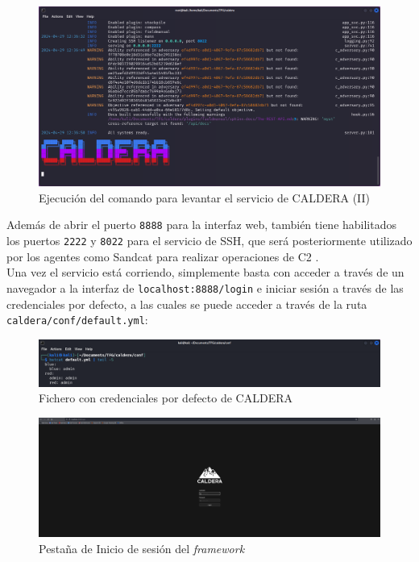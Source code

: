 \newpage

\begin{figure}[H]
    \centering
    
    \includegraphics[width=1\linewidth]{imagenes/build-caldera-2.png}
    \caption{Ejecución del comando para levantar el servicio de \gls{CALDERA} (II)}
    \label{fig:build-caldera-2}
\end{figure}

Además de abrir el puerto \texttt{8888} para la interfaz web, también tiene habilitados los puertos \texttt{2222} y \texttt{8022} para el servicio de \gls{SSH}, que será posteriormente utilizado por los agentes como Sandcat para realizar operaciones de \gls{C2} \cite{calderaSSHTunneling}. \\

Una vez el servicio está corriendo, simplemente basta con acceder a través de un navegador a la interfaz de \texttt{localhost:8888/login} e iniciar sesión a través de las credenciales por defecto, a las cuales se puede acceder a través de la ruta \texttt{caldera/conf/default.yml}:

\begin{figure}[H]
    \centering
    \includegraphics[width=1\linewidth]{imagenes/caldera-credentials.png}
    \caption{Fichero con credenciales por defecto de CALDERA}
    \label{fig:caldera-credentials}
\end{figure}

\begin{figure}[H]
    \centering
    \includegraphics[width=1\linewidth]{imagenes/login-caldera.png}
    \caption{Pestaña de Inicio de sesión del \textit{framework}}
    \label{fig:login-caldera}
\end{figure}

